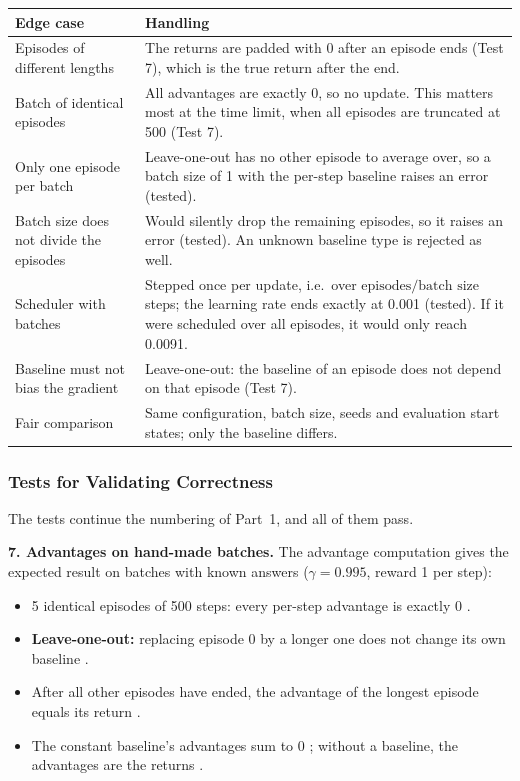 \begin{center}
\small
\begin{tabularx}{\textwidth}{@{}p{3.6cm}L@{}}
  \toprule
  \textbf{Edge case} & \textbf{Handling} \\
  \midrule
  Episodes of different lengths & The returns are padded with 0 after an episode ends (Test 7), which is the true return after the end. \\
  Batch of identical episodes & All advantages are exactly 0, so no update. This matters most at the time limit, when all episodes are truncated at 500 (Test 7). \\
  Only one episode per batch & Leave-one-out has no other episode to average over, so a batch size of 1 with the per-step baseline raises an error (tested). \\
  Batch size does not divide the episodes & Would silently drop the remaining episodes, so it raises an error (tested). An unknown baseline type is rejected as well. \\
  Scheduler with batches & Stepped once per update, i.e.\ over $\text{episodes} / \text{batch size}$ steps; the learning rate ends exactly at 0.001 (tested). If it were scheduled over all episodes, it would only reach 0.0091. \\
  Baseline must not bias the gradient & Leave-one-out: the baseline of an episode does not depend on that episode (Test 7). \\
  Fair comparison & Same configuration, batch size, seeds and evaluation start states; only the baseline differs. \\
  \bottomrule
\end{tabularx}
\end{center}

\subsubsection{Tests for Validating Correctness}

The tests continue the numbering of Part~1, and all of them pass.

\textbf{7. Advantages on hand-made batches.} The advantage computation gives the expected result on batches with known answers ($\gamma = 0.995$, reward 1 per step):
\begin{itemize}
  \item 5 identical episodes of 500 steps: every per-step advantage is exactly 0 \pass.
  \item \textbf{Leave-one-out:} replacing episode 0 by a longer one does not change its own baseline \pass.
  \item After all other episodes have ended, the advantage of the longest episode equals its return \pass.
  \item The constant baseline's advantages sum to 0 \pass; without a baseline, the advantages are the returns \pass.
\end{itemize}

